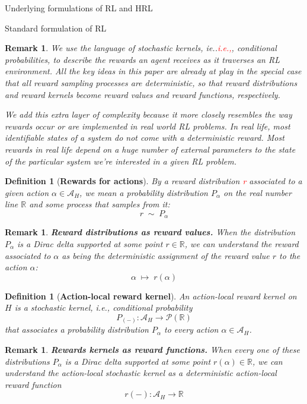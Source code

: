 \documentclass[11pt]{article}
\newtheorem{definition}[subsubsection]{Definition}
\newtheorem{remark}[subsubsection]{Remark}
\begin{document}
\begin{section}{Underlying formulations of RL and HRL}
\begin{subsection}{Standard formulation of RL}
\begin{remark}
{\bf }
\normalfont
We use the language of stochastic kernels, ie..\textcolor{red}{i.e.,}, conditional probabilities, to describe the rewards an agent receives as it traverses an RL environment. All the key ideas in this paper are already at play in the special case that all reward sampling processes are deterministic, so that reward distributions and reward kernels become reward values and reward functions, respectively.

We add this extra layer of complexity because {\em it more closely resembles the way rewards occur or are implemented in real world RL problems}. In real life, most identifiable states of a system do not come with a deterministic reward. Most rewards in real life depend on a huge number of external parameters to the state of the particular system we're interested in a given RL problem.
\end{remark}
 
 \begin{definition}[{\bf Rewards for actions}]
 \normalfont
By a {\em reward distribution} \textcolor{red}{r} associated to a given action $\alpha\in\mathcal{A}_{H}$, we mean a probability distribution $P_{\!\alpha}$ on the real number line $\mathbb{R}$ and some process that samples from it:
$$
r\;\sim\;P_{\!\alpha}
$$
\end{definition}

\begin{remark}
{\bf Reward distributions as reward values.}
\normalfont
When the distribution $P_{\!\alpha}$ is a Dirac delta supported at some point $r\in\mathbb{R}$, we can understand the {\em reward associated to} $\alpha$ as being the deterministic assignment of the reward value $r$ to the action $\alpha$:
$$
\alpha\;\mapsto\;r(\alpha)
$$
\end{remark}

\begin{definition}[{\bf Action-local reward kernel}]
An {\em action-local reward kernel} on $H$ is a stochastic kernel, i.e., conditional probability
$$
P_{(-)}:\mathcal{A}_{H}\longrightarrow \mathcal{P}(\mathbb{R})
$$
that associates a probability distribution $P_{\alpha}$ to every action $\alpha\in\mathcal{A}_{H}$.
\end{definition}

\begin{remark}
{\bf Rewards kernels as reward functions.}
\normalfont
When every one of these distributions $P_{\!\alpha}$ is a Dirac delta supported at some point $r(\alpha)\in\mathbb{R}$, we can understand the action-local stochastic kernel as a deterministic {\em action-local reward function}
$$
r(-):\mathcal{A}_{H}\longrightarrow\mathbb{R}
$$
\end{remark}


\end{subsection}
\end{section}
\end{document}
